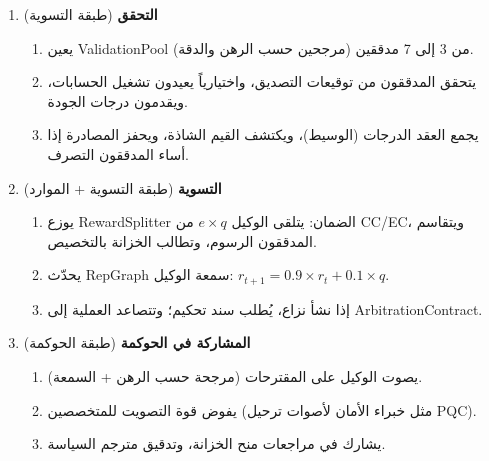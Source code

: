 \documentclass[11pt]{article}
\begin{document}
\begin{enumerate}
\begin{enumerate}[label=\alph*.]
      \item يوقع الوكيل النتيجة والتصديق، ويحسب تجزئة المحتوى، ويقدم عبر \texttt{submitWork()}.
    \end{enumerate}
  \item \textbf{التحقق} (طبقة التسوية)
    \begin{enumerate}[label=\alph*.]
      \item يعين ValidationPool من 3 إلى 7 مدققين (مرجحين حسب الرهن والدقة).
      \item يتحقق المدققون من توقيعات التصديق، واختيارياً يعيدون تشغيل الحسابات، ويقدمون درجات الجودة.
      \item يجمع العقد الدرجات (الوسيط)، ويكتشف القيم الشاذة، ويحفز المصادرة إذا أساء المدققون التصرف.
    \end{enumerate}
  \item \textbf{التسوية} (طبقة التسوية + الموارد)
    \begin{enumerate}[label=\alph*.]
      \item يوزع RewardSplitter الضمان: يتلقى الوكيل $e \times q$ من CC/EC، ويتقاسم المدققون الرسوم، وتطالب الخزانة بالتخصيص.
      \item يحدّث RepGraph سمعة الوكيل: $r_{t+1} = 0.9 \times r_t + 0.1 \times q$.
      \item إذا نشأ نزاع، يُطلب سند تحكيم؛ وتتصاعد العملية إلى ArbitrationContract.
    \end{enumerate}
  \item \textbf{المشاركة في الحوكمة} (طبقة الحوكمة)
    \begin{enumerate}[label=\alph*.]
      \item يصوت الوكيل على المقترحات (مرجحة حسب الرهن + السمعة).
      \item يفوض قوة التصويت للمتخصصين (مثل خبراء الأمان لأصوات ترحيل PQC).
      \item يشارك في مراجعات منح الخزانة، وتدقيق مترجم السياسة.
    \end{enumerate}
\end{enumerate}
\end{document}
